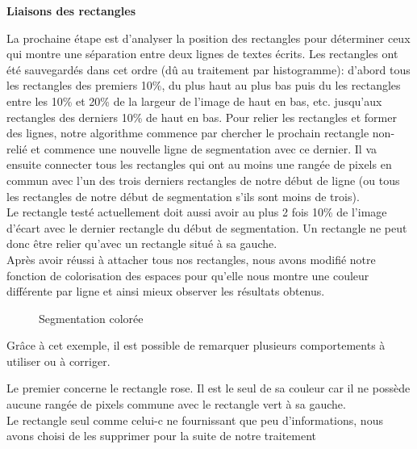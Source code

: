 \documentclass[12pt,a4paper]{article}
\begin{document}
\newpage

\bigbreak\textbf{Liaisons des rectangles}\bigbreak

La prochaine étape est d'analyser la position des rectangles pour déterminer ceux qui montre une séparation entre deux lignes de textes écrits.\bigbreak
Les rectangles ont été sauvegardés dans cet ordre (dû au traitement par histogramme): d'abord tous les rectangles des premiers 10\%, du plus haut au plus bas puis du les rectangles entre les 10\% et 20\% de la largeur de l'image de haut en bas, etc. jusqu'aux rectangles des derniers 10\% de haut en bas.\bigbreak
Pour relier les rectangles et former des lignes, notre algorithme commence par chercher le prochain rectangle non-relié et commence une nouvelle ligne de segmentation avec ce dernier. Il va ensuite connecter tous les rectangles qui ont au moins une rangée de pixels en commun avec l'un des trois derniers rectangles de notre début de ligne (ou tous les rectangles de notre début de segmentation s'ils sont moins de trois).\\
Le rectangle testé actuellement doit aussi avoir au plus 2 fois 10\% de l'image d'écart avec le dernier rectangle du début de segmentation.\bigbreak
Un rectangle ne peut donc être relier qu'avec un rectangle situé à sa gauche.\\
Après avoir réussi à attacher tous nos rectangles, nous avons modifié notre fonction de colorisation des espaces pour qu'elle nous montre une couleur différente par ligne et ainsi mieux observer les résultats obtenus.

\begin{figure}[!h]
\centering
    \caption{Segmentation colorée}
    \label{img:coloredrectangles}
\end{figure}

\newpage
Grâce à cet exemple, il est possible de remarquer plusieurs comportements à utiliser ou à corriger.\bigbreak

Le premier concerne le rectangle rose. Il est le seul de sa couleur car il ne possède aucune rangée de pixels commune avec le rectangle vert à sa gauche.\\
Le rectangle seul comme celui-c ne fournissant que peu d'informations, nous avons choisi de les supprimer pour la suite de notre traitement\bigbreak
\end{document}
